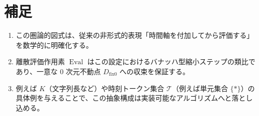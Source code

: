 \documentclass[12pt,a4paper]{article}
\newcommand{\dfix}{D_{\mathrm{fix}0}} %
\newcommand{\Tset}{\mathcal{T}}          %
\begin{document}
\section{補足}

\begin{enumerate}
  \item この圏論的図式は、従来の非形式的表現「時間軸を付加してから評価する」を数学的に明確化する。
  \item 離散評価作用素 $\operatorname{Eval}$ はこの設定におけるバナッハ型縮小ステップの類比であり、一意な $0$ 次元不動点 $\dfix$ への収束を保証する。
  \item 例えば $K$（文字列長など）や時刻トークン集合 $\Tset$（例えば単元集合 $\{*\}$）の具体例を与えることで、この抽象構成は実装可能なアルゴリズムへと落とし込める。
\end{enumerate}
\end{document}
